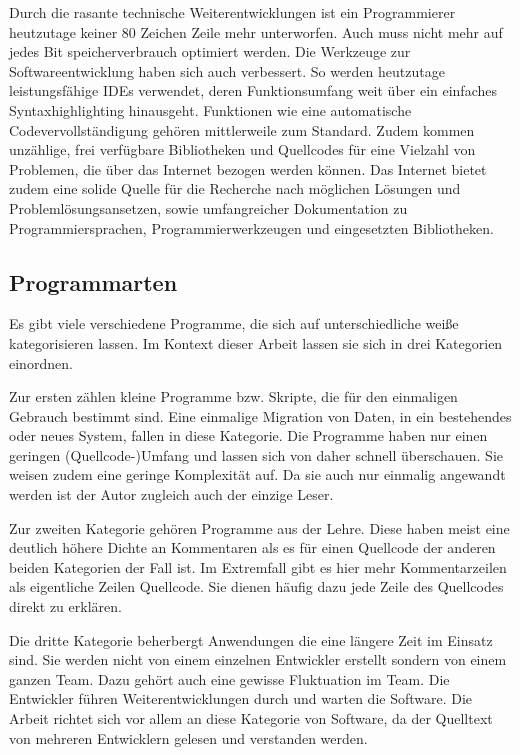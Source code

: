 Durch die rasante technische Weiterentwicklungen ist ein Programmierer heutzutage keiner
80 Zeichen Zeile mehr unterworfen. Auch muss nicht mehr auf jedes Bit speicherverbrauch
optimiert werden. Die Werkzeuge zur Softwareentwicklung haben sich auch verbessert. So
werden heutzutage leistungsfähige IDEs verwendet, deren Funktionsumfang weit über ein
einfaches Syntaxhighlighting hinausgeht. Funktionen wie eine automatische Codevervollständigung
gehören mittlerweile zum Standard. Zudem kommen unzählige, frei verfügbare Bibliotheken und Quellcodes
für eine Vielzahl von Problemen, die über das Internet bezogen werden können. Das Internet bietet zudem
eine solide Quelle für die Recherche nach möglichen Lösungen und Problemlösungsansetzen, sowie
umfangreicher Dokumentation zu Programmiersprachen, Programmierwerkzeugen und eingesetzten Bibliotheken.

\subsection{Programmarten}

Es gibt viele verschiedene Programme, die sich auf unterschiedliche weiße kategorisieren lassen. Im Kontext dieser Arbeit lassen sie sich in drei Kategorien einordnen.

Zur ersten zählen kleine Programme bzw. Skripte, die für den einmaligen
Gebrauch bestimmt sind. Eine einmalige Migration von Daten, in ein bestehendes
oder neues System, fallen in diese Kategorie. Die Programme haben nur einen
geringen (Quellcode-)Umfang und lassen sich von daher schnell überschauen. Sie weisen zudem eine geringe Komplexität auf. Da sie auch nur einmalig angewandt werden ist der Autor zugleich auch der einzige Leser.

Zur zweiten Kategorie gehören Programme aus der Lehre. Diese haben meist eine
deutlich höhere Dichte an Kommentaren als es für einen Quellcode der anderen
beiden Kategorien der Fall ist. Im Extremfall gibt es hier mehr Kommentarzeilen als eigentliche Zeilen Quellcode.  Sie dienen häufig dazu jede Zeile des Quellcodes direkt zu erklären.

Die dritte Kategorie beherbergt Anwendungen die eine längere Zeit im Einsatz sind.
Sie werden nicht von einem einzelnen Entwickler erstellt sondern von einem ganzen Team. Dazu gehört auch eine gewisse Fluktuation im Team. Die Entwickler führen Weiterentwicklungen durch und warten die Software. Die Arbeit richtet sich vor allem an diese Kategorie von Software, da der Quelltext von mehreren Entwicklern gelesen und 
verstanden werden.

